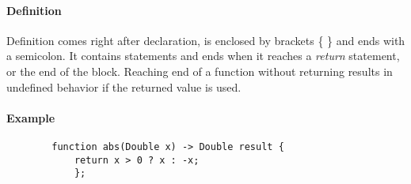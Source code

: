 \documentclass[a4paper, 12pt]{article}
\begin{document}
	\paragraph{Definition}
	Definition comes right after declaration, is enclosed by brackets \{ \} and ends with a semicolon. It contains statements and ends when it reaches a \textit{return} statement, or the end of the block. Reaching end of a function without returning results in undefined behavior if the returned value is used.
	
	\paragraph{Example} 
	\begin{verbatim}
		function abs(Double x) -> Double result {
		    return x > 0 ? x : -x;
		    };	
	\end{verbatim}
	
	
	
	
\end{document}
